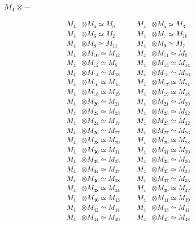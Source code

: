 \subsubsection{$ M_{4}\otimes -$}
\begin{align*}
M_{4} &\otimes M_{4} \simeq M_{6} &&& M_{4} &\otimes M_{5} \simeq M_{3}\\
M_{4} &\otimes M_{6} \simeq M_{2} &&& M_{4} &\otimes M_{7} \simeq M_{10}\\
M_{4} &\otimes M_{8} \simeq M_{11} &&& M_{4} &\otimes M_{9} \simeq M_{7}\\
M_{4} &\otimes M_{10} \simeq M_{12} &&& M_{4} &\otimes M_{11} \simeq M_{9}\\
M_{4} &\otimes M_{12} \simeq M_{8} &&& M_{4} &\otimes M_{13} \simeq M_{14}\\
M_{4} &\otimes M_{14} \simeq M_{13} &&& M_{4} &\otimes M_{15} \simeq M_{16}\\
M_{4} &\otimes M_{16} \simeq M_{15} &&& M_{4} &\otimes M_{17} \simeq M_{24}\\
M_{4} &\otimes M_{18} \simeq M_{19} &&& M_{4} &\otimes M_{19} \simeq M_{18}\\
M_{4} &\otimes M_{20} \simeq M_{21} &&& M_{4} &\otimes M_{21} \simeq M_{20}\\
M_{4} &\otimes M_{22} \simeq M_{23} &&& M_{4} &\otimes M_{23} \simeq M_{22}\\
M_{4} &\otimes M_{24} \simeq M_{17} &&& M_{4} &\otimes M_{25} \simeq M_{32}\\
M_{4} &\otimes M_{26} \simeq M_{27} &&& M_{4} &\otimes M_{27} \simeq M_{26}\\
M_{4} &\otimes M_{28} \simeq M_{29} &&& M_{4} &\otimes M_{29} \simeq M_{28}\\
M_{4} &\otimes M_{30} \simeq M_{31} &&& M_{4} &\otimes M_{31} \simeq M_{30}\\
M_{4} &\otimes M_{32} \simeq M_{25} &&& M_{4} &\otimes M_{33} \simeq M_{36}\\
M_{4} &\otimes M_{34} \simeq M_{37} &&& M_{4} &\otimes M_{35} \simeq M_{33}\\
M_{4} &\otimes M_{36} \simeq M_{38} &&& M_{4} &\otimes M_{37} \simeq M_{35}\\
M_{4} &\otimes M_{38} \simeq M_{34} &&& M_{4} &\otimes M_{39} \simeq M_{42}\\
M_{4} &\otimes M_{40} \simeq M_{43} &&& M_{4} &\otimes M_{41} \simeq M_{39}\\
M_{4} &\otimes M_{42} \simeq M_{44} &&& M_{4} &\otimes M_{43} \simeq M_{41}\\
M_{4} &\otimes M_{44} \simeq M_{40} &&& M_{4} &\otimes M_{45} \simeq M_{48}\\

\end{align*}
